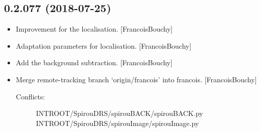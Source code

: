\documentclass[a4paper,10pt,english]{report}
\begin{document}
\subsection{0.2.077 (2018-07-25)}
\label{\detokenize{misc/changelog:id385}}\begin{itemize}
\item {} 
Improvement for the localisation. {[}FrancoisBouchy{]}

\item {} 
Adaptation parameters for localisation. {[}FrancoisBouchy{]}

\item {} 
Add the background subtraction. {[}FrancoisBouchy{]}

\item {} 
Merge remote-tracking branch ‘origin/francois’ into francois.
{[}FrancoisBouchy{]}
\begin{description}
\item[{Conflicts:}] \leavevmode
{}
INTROOT/SpirouDRS/spirouBACK/spirouBACK.py
INTROOT/SpirouDRS/spirouImage/spirouImage.py

\end{description}

\end{itemize}
\end{document}
